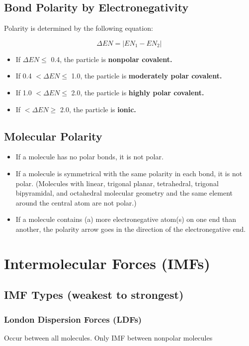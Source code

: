 \documentclass[a4paper, 12pt]{article}
\begin{document}
\subsection{Bond Polarity by Electronegativity}
Polarity is determined by the following equation:

$$\Delta EN = |EN_1 - EN_2| $$

\begin{itemize}[leftmargin=*, nosep]
\item \noindent If $\Delta EN \leq$ 0.4, the particle is \textbf{nonpolar covalent.}
\item If 0.4 $< \Delta EN \leq$ 1.0, the particle is \textbf{moderately polar covalent.}
\item If 1.0 $< \Delta EN \leq$ 2.0, the particle is \textbf{highly polar covalent.}
\item If $< \Delta EN \geq$ 2.0, the particle is \textbf{ionic.}
\end{itemize}

\subsection{Molecular Polarity}

\begin{itemize}[leftmargin=*, nosep]
    \item If a molecule has no polar bonds, it is not polar.
    \item If a molecule is symmetrical with the same polarity in each bond, it is not polar. (Molecules with linear, trigonal planar, tetrahedral, trigonal bipyramidal, and octahedral molecular geometry and the same element around the central atom are not polar.)
    \item If a molecule contains (a) more electronegative atom(s) on one end than another, the polarity arrow goes in the direction of the electronegative end.
\end{itemize}

\section{Intermolecular Forces (IMFs)}

\subsection{IMF Types (weakest to strongest)}

\subsubsection{London Dispersion Forces (LDFs)}
Occur between all molecules. Only IMF between nonpolar molecules
\end{document}
